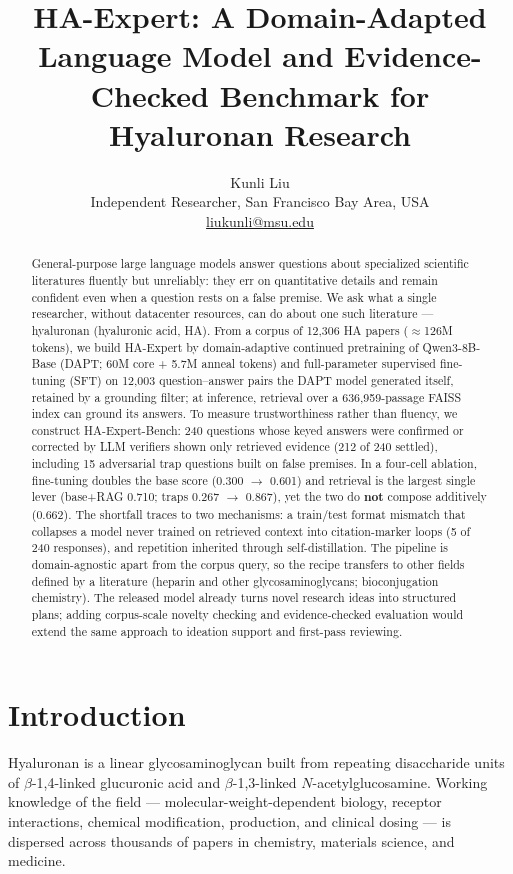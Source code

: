 \documentclass[11pt]{article}
\title{HA-Expert: A Domain-Adapted Language Model and Evidence-Checked
Benchmark for Hyaluronan Research}
\author{Kunli Liu\\
Independent Researcher, San Francisco Bay Area, USA\\
\href{mailto:liukunli@msu.edu}{liukunli@msu.edu}}
\date{}
\begin{document}
\maketitle


\begin{abstract}
General-purpose large language models answer questions about
specialized scientific literatures fluently but unreliably: they err
on quantitative details and remain confident even when a question rests
on a false premise. We ask what a single researcher, without
datacenter resources, can do about one such literature ---
hyaluronan (hyaluronic acid, HA). From a corpus of 12,306 HA papers
($\approx$126M tokens), we build HA-Expert by domain-adaptive
continued pretraining of Qwen3-8B-Base (DAPT; 60M core + 5.7M anneal tokens) and
full-parameter supervised fine-tuning (SFT) on 12,003
question--answer pairs the DAPT model generated itself, retained by a
grounding filter; at inference, retrieval over a 636,959-passage FAISS
index can ground its answers. To measure trustworthiness rather than
fluency, we construct HA-Expert-Bench: 240 questions whose keyed
answers were confirmed or corrected by LLM verifiers shown only
retrieved evidence (212 of 240 settled), including 15 adversarial
trap questions built on false premises. In a four-cell ablation,
fine-tuning doubles the base score (0.300 $\rightarrow$ 0.601) and
retrieval is the largest single lever (base+RAG 0.710; traps 0.267
$\rightarrow$ 0.867), yet the two do \textbf{not} compose additively
(0.662). The shortfall traces to two mechanisms: a train/test format
mismatch that collapses a model never trained on retrieved context
into citation-marker loops (5 of 240 responses), and repetition
inherited through self-distillation. The pipeline is domain-agnostic
apart from the corpus query, so the recipe transfers to other fields
defined by a literature (heparin and other glycosaminoglycans;
bioconjugation chemistry). The released model already turns novel
research ideas into structured plans; adding corpus-scale novelty
checking and evidence-checked evaluation would extend the same
approach to ideation support and first-pass reviewing.
\end{abstract}

\section{Introduction}
\label{sec:intro}

Hyaluronan is a linear glycosaminoglycan built from repeating
disaccharide units of $\beta$-1,4-linked glucuronic acid and
$\beta$-1,3-linked $N$-acetylglucosamine. Working knowledge of the
field --- molecular-weight-dependent biology, receptor interactions,
chemical modification, production, and clinical dosing --- is dispersed
across thousands of papers in chemistry, materials science, and
medicine.
\end{document}
